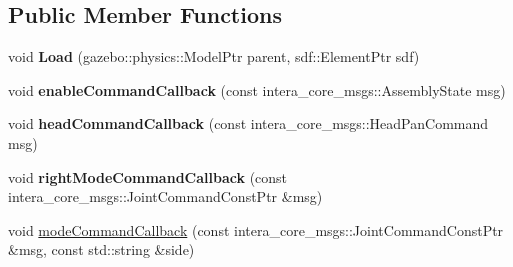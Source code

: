 \subsection*{Public Member Functions}
\begin{DoxyCompactItemize}
\item 
\hypertarget{classsawyer__gazebo__plugin_1_1_sawyer_gazebo_ros_control_plugin_a79dd7527929c20b9c27d75e4fd30bccb}{void {\bfseries Load} (gazebo\-::physics\-::\-Model\-Ptr parent, sdf\-::\-Element\-Ptr sdf)}\label{classsawyer__gazebo__plugin_1_1_sawyer_gazebo_ros_control_plugin_a79dd7527929c20b9c27d75e4fd30bccb}

\item 
\hypertarget{classsawyer__gazebo__plugin_1_1_sawyer_gazebo_ros_control_plugin_af2c89f1d9521a2e88cd7cd7524dc6d4d}{void {\bfseries enable\-Command\-Callback} (const intera\-\_\-core\-\_\-msgs\-::\-Assembly\-State msg)}\label{classsawyer__gazebo__plugin_1_1_sawyer_gazebo_ros_control_plugin_af2c89f1d9521a2e88cd7cd7524dc6d4d}

\item 
\hypertarget{classsawyer__gazebo__plugin_1_1_sawyer_gazebo_ros_control_plugin_a795aa6394ef757d33d8b550110fbe4f1}{void {\bfseries head\-Command\-Callback} (const intera\-\_\-core\-\_\-msgs\-::\-Head\-Pan\-Command msg)}\label{classsawyer__gazebo__plugin_1_1_sawyer_gazebo_ros_control_plugin_a795aa6394ef757d33d8b550110fbe4f1}

\item 
\hypertarget{classsawyer__gazebo__plugin_1_1_sawyer_gazebo_ros_control_plugin_a96fe745f6eb99d7c8e33a421215bd0a1}{void {\bfseries right\-Mode\-Command\-Callback} (const intera\-\_\-core\-\_\-msgs\-::\-Joint\-Command\-Const\-Ptr \&msg)}\label{classsawyer__gazebo__plugin_1_1_sawyer_gazebo_ros_control_plugin_a96fe745f6eb99d7c8e33a421215bd0a1}

\item 
void \hyperlink{classsawyer__gazebo__plugin_1_1_sawyer_gazebo_ros_control_plugin_aa9ffbc75bbe5769b77c7cf837920afc7}{mode\-Command\-Callback} (const intera\-\_\-core\-\_\-msgs\-::\-Joint\-Command\-Const\-Ptr \&msg, const std\-::string \&side)
\end{DoxyCompactItemize}


